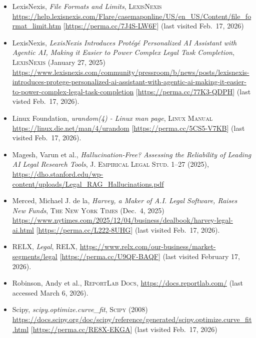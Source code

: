 \documentclass[
]{article}
\begin{document}
\begin{itemize}
  LexisNexis, \emph{LexisNexis Launches Lexis+ AI, a Generative AI Solution with Hallucination-Free Linked Legal Citations}, \textsc{LexisNexis News} (October 25, 2023), \url{https://www.lexisnexis.com/community/pressroom/b/news/posts/lexisnexis-launches-lexis-ai-a-generative-ai-solution-with-hallucination-free-linked-legal-citations} {[}\url{https://perma.cc/D24V-JADS}{]}
\item
  LexisNexis, \emph{File Formats and Limits}, \textsc{LexisNexis} \url{https://help.lexisnexis.com/Flare/casemaponline/US/en_US/Content/file_format_limit.htm} {[}\url{https://perma.cc/7J4S-LW6F}{]} (last visited Feb.~17, 2026)
\item
  LexisNexis, \emph{LexisNexis Introduces Protégé Personalized AI Assistant with Agentic AI, Making it Easier to Power Complex Legal Task Completion}, \textsc{LexisNexis} (January 27, 2025) \url{https://www.lexisnexis.com/community/pressroom/b/news/posts/lexisnexis-introduces-protege-personalized-ai-assistant-with-agentic-ai-making-it-easier-to-power-complex-legal-task-completion} {[}\url{https://perma.cc/77K3-QDPH}{]} (last visted Feb.~17, 2026).
\item
  Linux Foundation, \emph{urandom(4) - Linux man page}, \textsc{Linux Manual} \url{https://linux.die.net/man/4/urandom} {[}\url{https://perma.cc/5CS5-V7KB}{]} (last visited Feb.~17, 2026).
\item
  Magesh, Varun et al., \emph{Hallucination-Free? Assessing the Reliability of Leading AI Legal Research Tools}, \textsc{J. Empirical Legal Stud.} 1--27 (2025), \url{https://dho.stanford.edu/wp-content/uploads/Legal_RAG_Hallucinations.pdf}
\item
  Merced, Michael J. de la, \emph{Harvey, a Maker of A.I. Legal Software, Raises New Funds}, \textsc{The New York Times} (Dec.~4, 2025) \url{https://www.nytimes.com/2025/12/04/business/dealbook/harvey-legal-ai.html} {[}\url{https://perma.cc/L222-8UHG}{]} (last visited Feb.~17, 2026).
\item
  RELX, \emph{Legal}, \textsc{RELX}, \url{https://www.relx.com/our-business/market-segments/legal} {[}\url{https://perma.cc/U9QF-BAQF}{]} (last visited February 17, 2026).
\item
  Robinson, Andy et al., \textsc{ReportLab Docs}, \url{https://docs.reportlab.com/} (last accessed March 6, 2026).
\item
  Scipy, \emph{scipy.optimize.curve\_fit}, \textsc{Scipy} (2008) \url{https://docs.scipy.org/doc/scipy/reference/generated/scipy.optimize.curve_fit.html} {[}\url{https://perma.cc/RE8X-EKGA}{]} (last visited Feb.~17, 2026)

\end{itemize}
\end{document}
